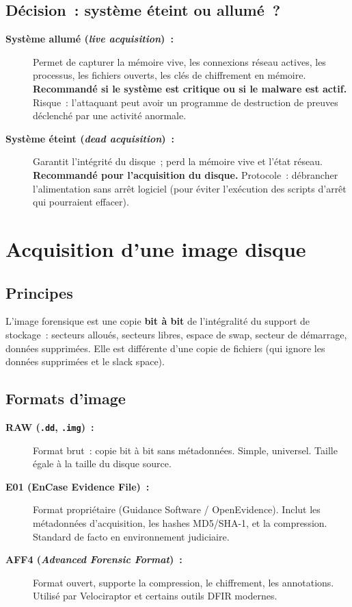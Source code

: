 \subsection{Décision~: système éteint ou allumé~?}

\begin{description}
  \item[\textbf{Système allumé (\textit{live acquisition})~:}]
        Permet de capturer la mémoire vive, les connexions réseau actives,
        les processus, les fichiers ouverts, les clés de chiffrement en mémoire.
        \textbf{Recommandé si le système est critique ou si le malware est actif.}
        Risque~: l'attaquant peut avoir un programme de destruction de preuves
        déclenché par une activité anormale.
  \item[\textbf{Système éteint (\textit{dead acquisition})~:}]
        Garantit l'intégrité du disque~; perd la mémoire vive et l'état
        réseau. \textbf{Recommandé pour l'acquisition du disque.}
        Protocole~: débrancher l'alimentation sans arrêt logiciel (pour
        éviter l'exécution des scripts d'arrêt qui pourraient effacer).
\end{description}

\section{Acquisition d'une image disque}
\label{sec:acquisition}

\subsection{Principes}

L'image forensique est une copie \textbf{bit à bit} de l'intégralité du
support de stockage~: secteurs alloués, secteurs libres, espace de swap,
secteur de démarrage, données supprimées. Elle est différente d'une copie
de fichiers (qui ignore les données supprimées et le slack space).

\subsection{Formats d'image}

\begin{description}
  \item[\textbf{RAW (\texttt{.dd}, \texttt{.img})~:}]
        Format brut~: copie bit à bit sans métadonnées. Simple, universel.
        Taille égale à la taille du disque source.
  \item[\textbf{E01 (EnCase Evidence File)~:}]
        Format propriétaire (Guidance Software / OpenEvidence).
        Inclut les métadonnées d'acquisition, les hashes MD5/SHA-1,
        et la compression. Standard de facto en environnement judiciaire.
  \item[\textbf{AFF4 (\textit{Advanced Forensic Format})~:}]
        Format ouvert, supporte la compression, le chiffrement, les
        annotations. Utilisé par Velociraptor et certains outils DFIR modernes.
\end{description}

